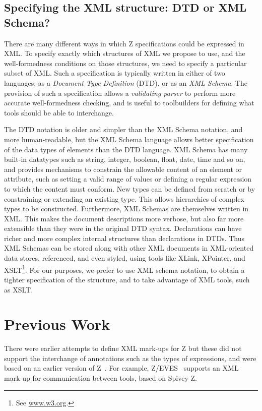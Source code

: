 \documentclass{llncs}  %
\begin{document}
\subsection{Specifying the XML structure: DTD or XML Schema?}

There are many different ways in which Z specifications could be
expressed in XML.  
To specify exactly which structures of XML we propose to
use, and the well-formedness conditions on those structures, we need to
specify a particular subset of XML.
Such a specification is typically written in either of two languages:
as a \textit{Document Type Definition} (DTD), or as an \textit{XML
  Schema}.  The provision of such a specification allows a
\textit{validating parser} to perform more accurate well-formedness
checking, and is useful to toolbuilders for defining what tools should be
able to interchange.

The DTD notation is older and simpler than the XML Schema notation, and
more human-readable, but the XML Schema language allows better
specification of the data types of elements than the DTD language.  XML
Schema has many built-in datatypes such as string, integer, boolean, float,
date, time and so on, and provides mechanisms to constrain the allowable
content of an element or attribute, such as setting a valid range of values
or defining a regular expression to which the content must conform.  New
types can be defined from scratch or by constraining or extending an
existing type.  This allows hierarchies of complex types to be constructed.
Furthermore, XML Schemas are themselves written in XML.  This makes the
document descriptions more verbose, but also far more extensible than they
were in the original DTD syntax. Declarations can have richer and more
complex internal structures than declarations in DTDs. Thus XML Schemas can
be stored along with other XML documents in XML-oriented data stores,
referenced, and even styled, using tools like XLink, XPointer, and
XSLT\footnote{See \url{www.w3.org}.}. For our purposes, we prefer to use XML
schema notation, to obtain a tighter specification of the structure, and to
take advantage of XML tools, such as XSLT.


\section{Previous Work}

There were earlier attempts to define XML mark-ups for Z
\cite{Wordsworth99,Dong01} but these did not support the interchange of
annotations such as the types of expressions, and were based on an earlier
version of Z~\cite{spivey:z-notation2}. 
For example, Z/EVES~\cite{saaltink:zeves-system} supports an XML mark-up
for communication between tools, based on Spivey Z.
\end{document}
